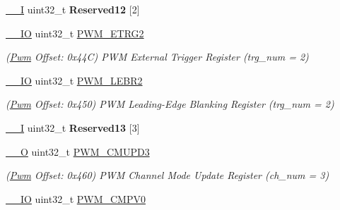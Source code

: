 \begin{DoxyCompactItemize}
\mbox{\hyperlink{core__cm7_8h_af63697ed9952cc71e1225efe205f6cd3}{\+\_\+\+\_\+I}} uint32\+\_\+t {\bfseries Reserved12} \mbox{[}2\mbox{]}
\item 
\mbox{\label{structPwm_a5099c5bd5bee102dbd4a1f883bc58dd8}} 
\mbox{\hyperlink{core__cm7_8h_aec43007d9998a0a0e01faede4133d6be}{\+\_\+\+\_\+\+IO}} uint32\+\_\+t \mbox{\hyperlink{structPwm_a5099c5bd5bee102dbd4a1f883bc58dd8}{P\+W\+M\+\_\+\+E\+T\+R\+G2}}
\begin{DoxyCompactList}\small\item\em (\mbox{\hyperlink{structPwm}{Pwm}} Offset\+: 0x44C) P\+WM External Trigger Register (trg\+\_\+num = 2) \end{DoxyCompactList}\item 
\mbox{\label{structPwm_a659974ffb8eeb2512077e7e464866af3}} 
\mbox{\hyperlink{core__cm7_8h_aec43007d9998a0a0e01faede4133d6be}{\+\_\+\+\_\+\+IO}} uint32\+\_\+t \mbox{\hyperlink{structPwm_a659974ffb8eeb2512077e7e464866af3}{P\+W\+M\+\_\+\+L\+E\+B\+R2}}
\begin{DoxyCompactList}\small\item\em (\mbox{\hyperlink{structPwm}{Pwm}} Offset\+: 0x450) P\+WM Leading-\/\+Edge Blanking Register (trg\+\_\+num = 2) \end{DoxyCompactList}\item 
\mbox{\label{structPwm_a0c356cce300c3750711850ad8a6bf041}} 
\mbox{\hyperlink{core__cm7_8h_af63697ed9952cc71e1225efe205f6cd3}{\+\_\+\+\_\+I}} uint32\+\_\+t {\bfseries Reserved13} \mbox{[}3\mbox{]}
\item 
\mbox{\label{structPwm_a90782f05debeb04617fbf7f0c38ed6ba}} 
\mbox{\hyperlink{core__cm7_8h_a7e25d9380f9ef903923964322e71f2f6}{\+\_\+\+\_\+O}} uint32\+\_\+t \mbox{\hyperlink{structPwm_a90782f05debeb04617fbf7f0c38ed6ba}{P\+W\+M\+\_\+\+C\+M\+U\+P\+D3}}
\begin{DoxyCompactList}\small\item\em (\mbox{\hyperlink{structPwm}{Pwm}} Offset\+: 0x460) P\+WM Channel Mode Update Register (ch\+\_\+num = 3) \end{DoxyCompactList}\item 
\mbox{\label{structPwm_a1fc1f26f77e1e97a23a016ca37f52ae4}} 
\mbox{\hyperlink{core__cm7_8h_aec43007d9998a0a0e01faede4133d6be}{\+\_\+\+\_\+\+IO}} uint32\+\_\+t \mbox{\hyperlink{structPwm_a1fc1f26f77e1e97a23a016ca37f52ae4}{P\+W\+M\+\_\+\+C\+M\+P\+V0}}

\end{DoxyCompactItemize}
